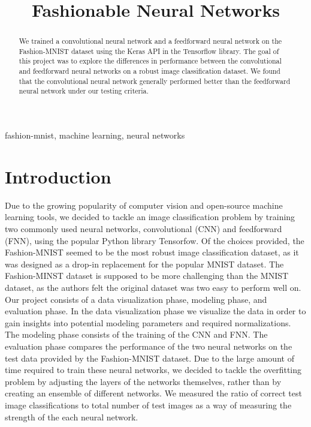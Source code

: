\documentclass[conference]{IEEEtran}
\begin{document}
\title{Fashionable Neural Networks}

\author{
}

\maketitle

\begin{abstract}
We trained a convolutional neural network and a feedforward neural network on the Fashion-MNIST
dataset using the Keras API in the Tensorflow library. The goal of this project was to explore
the differences in performance between the convolutional and feedforward neural networks on a robust
image classification dataset. We found that the convolutional neural network generally performed
better than the feedforward neural network under our testing criteria.
\end{abstract}

\begin{IEEEkeywords}
fashion-mnist, machine learning, neural networks
\end{IEEEkeywords}

\section{Introduction}
Due to the growing popularity of computer vision and open-source machine learning tools, we decided
to tackle an image classification problem by training two commonly used neural networks, convolutional (CNN) and
feedforward (FNN), using the popular Python library Tensorfow. Of the choices provided, the Fashion-MNIST seemed to
be the most robust image classification dataset, as it was designed as a drop-in replacement for the popular MNIST dataset.
The Fashion-MINST dataset is supposed to be more challenging than the MNIST dataset, as the authors felt the original dataset
was two easy to perform well on. Our project consists of a data visualization phase, modeling phase, and evaluation phase. 
In the data visualization phase we visualize the data in order to gain insights into potential modeling parameters and required
normalizations. The modeling phase consists of the training of the CNN and FNN. The evaluation phase compares the performance of the two
neural networks on the test data provided by the Fashion-MNIST \cite{fashionmnist} dataset. Due to the large amount of time required
to train these neural networks, we decided to tackle the overfitting problem by adjusting the layers of the networks themselves,
rather than by creating an ensemble of different networks. We measured the ratio of correct
test image classifications to total number of test images as a way of measuring the strength of the each neural network.
\end{document}
